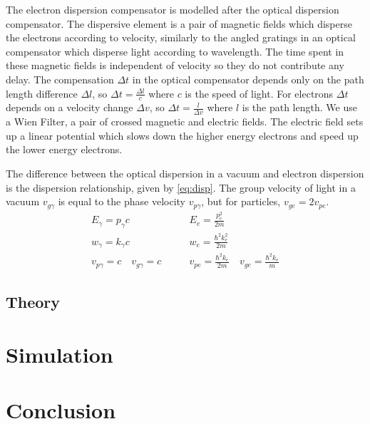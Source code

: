 \documentclass[12pt,letterpaper]{article}
\begin{document}
The electron dispersion compensator is modelled after the optical dispersion compensator.  The dispersive element is a pair of magnetic fields which disperse the electrons according to velocity, similarly to the angled gratings in an optical compensator which disperse light according to wavelength. The time spent in these magnetic fields is independent of velocity so they do not contribute any delay. The compensation $\Delta t$ in the optical compensator depends only on the path length difference $\Delta l$, so $\Delta t=\frac{\Delta l}{c}$ where $c$ is the speed of light. For electrons $\Delta t$ depends on a velocity change $\Delta v$, so $\Delta t = \frac{l}{\Delta v}$ where $l$ is the path length. We use a Wien Filter, a pair of crossed magnetic and electric fields. The electric field sets up a linear potential which slows down the higher energy electrons and speed up the lower energy electrons. 

The difference between the optical dispersion in a vacuum and electron dispersion is the dispersion relationship, given by \eqref{eq:disp}. The group velocity of light in a vacuum $v_{g \gamma}$ is equal to the phase velocity $v_{p\gamma}$, but for particles, $v_{ge}=2 v_{pe}$. 
\begin{align}
   \label{eq:disp}
E_\gamma=p_\gamma c &\qquad E_e=\frac{p_e^2}{2m}\\ 
w_\gamma =k_\gamma c &\qquad  w_e =\frac{\hbar^2 k_e^2}{2m} \\
v_{p\gamma} =c \quad v_{g\gamma}=c &\qquad  v_{pe} = \frac{\hbar^2 k_e}{2m} \quad v_{ge} = \frac{\hbar^2 k_e}{m}
\end{align}

\subsection{Theory}


\section{Simulation}

\section{Conclusion}
\end{document}
